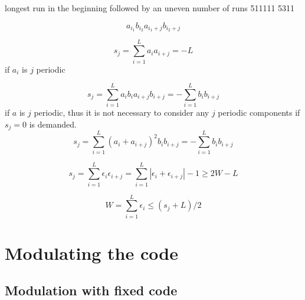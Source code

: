 \documentclass[18pt,a4paper]{extarticle}
\begin{document}
longest run in the beginning
followed by an uneven number of runs
511111
5311

\begin{equation}
a_{i_1}b_{i_2}a_{i_1+j}b_{i_2+j}
\end{equation}

\begin{equation}
s_j = \sum_{i=1}^{L} a_i a_{i+j} = -L
\end{equation}
if $a_i$ is $j$ periodic


\begin{equation}
s_j = \sum_{i=1}^{L} a_ib_i a_{i+j} b_{i+j} = - \sum_{i=1}^{L} b_i b_{i+j}
\end{equation}
if $a$ is $j$ periodic, thus it is not necessary to consider any $j$ periodic components if $s_j=0$ is demanded.
\begin{equation}
s_j = \sum_{i=1}^{L} (a_i + a_{i+j})^2 b_i  b_{i+j} = - \sum_{i=1}^{L} b_i b_{i+j}
\end{equation}

\begin{equation}
s_j = \sum_{i=1}^{L} \epsilon_i \epsilon_{i+j} = \sum_{i=1}^{L} |\epsilon_i + \epsilon_{i+j}| - 1 \geq 2 W - L
\end{equation}

\begin{equation}
W = \sum_{i=1}^{L} \epsilon_i \leq (s_j + L)/2
\end{equation}

\section{Modulating the code}
\subsection{Modulation with fixed code}
\end{document}
